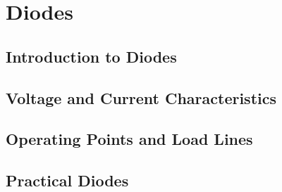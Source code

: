 \chapter{Diodes}
\label{cha:didoes}
    \section{Introduction to Diodes}
    \section{Voltage and Current Characteristics}
    \section{Operating Points and Load Lines}
    \section{Practical Diodes}